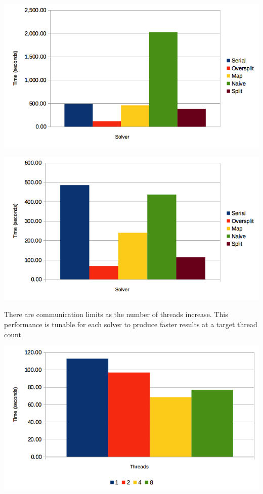\documentclass{acm_proc_article-sp}
\begin{document}
\begin{centering}
\includegraphics[width=.9\linewidth]{t1}

\includegraphics[width=.9\linewidth]{t44}
\end{centering}

There are communication limits as the number of threads increase. This performance is tunable for each solver to produce faster results at a target thread count.

\begin{centering}
\includegraphics[width=.9\linewidth]{os}

\end{centering}
\end{document}
